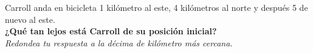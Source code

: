 \question[15]  Carroll anda en bicicleta 1 kilómetro al este, 4 kilómetros al norte y después 5 de nuevo al este.\\
\textbf{¿Qué tan lejos está Carroll de su posición inicial?}\\
\textit{Redondea tu respuesta a la décima de kilómetro más cercana.}